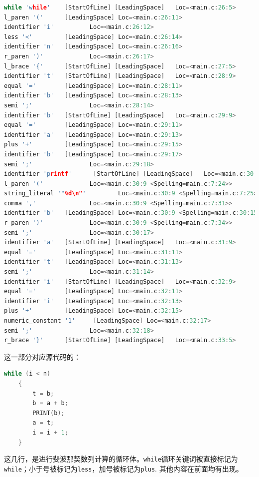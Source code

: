 \documentclass[UTF8,a4paper,10pt]{ctexart}
\begin{document}
\begin{lstlisting}[title=词法分析片段 7,frame=trbl,language={C++}]
while 'while'    [StartOfLine] [LeadingSpace]   Loc=<main.c:26:5>
l_paren '('      [LeadingSpace] Loc=<main.c:26:11>
identifier 'i'          Loc=<main.c:26:12>
less '<'         [LeadingSpace] Loc=<main.c:26:14>
identifier 'n'   [LeadingSpace] Loc=<main.c:26:16>
r_paren ')'             Loc=<main.c:26:17>
l_brace '{'      [StartOfLine] [LeadingSpace]   Loc=<main.c:27:5>
identifier 't'   [StartOfLine] [LeadingSpace]   Loc=<main.c:28:9>
equal '='        [LeadingSpace] Loc=<main.c:28:11>
identifier 'b'   [LeadingSpace] Loc=<main.c:28:13>
semi ';'                Loc=<main.c:28:14>
identifier 'b'   [StartOfLine] [LeadingSpace]   Loc=<main.c:29:9>
equal '='        [LeadingSpace] Loc=<main.c:29:11>
identifier 'a'   [LeadingSpace] Loc=<main.c:29:13>
plus '+'         [LeadingSpace] Loc=<main.c:29:15>
identifier 'b'   [LeadingSpace] Loc=<main.c:29:17>
semi ';'                Loc=<main.c:29:18>
identifier 'printf'      [StartOfLine] [LeadingSpace]   Loc=<main.c:30:9 <Spelling=main.c:7:18>>
l_paren '('             Loc=<main.c:30:9 <Spelling=main.c:7:24>>
string_literal '"%d\n"'         Loc=<main.c:30:9 <Spelling=main.c:7:25>>
comma ','               Loc=<main.c:30:9 <Spelling=main.c:7:31>>
identifier 'b'   [LeadingSpace] Loc=<main.c:30:9 <Spelling=main.c:30:15>>
r_paren ')'             Loc=<main.c:30:9 <Spelling=main.c:7:34>>
semi ';'                Loc=<main.c:30:17>
identifier 'a'   [StartOfLine] [LeadingSpace]   Loc=<main.c:31:9>
equal '='        [LeadingSpace] Loc=<main.c:31:11>
identifier 't'   [LeadingSpace] Loc=<main.c:31:13>
semi ';'                Loc=<main.c:31:14>
identifier 'i'   [StartOfLine] [LeadingSpace]   Loc=<main.c:32:9>
equal '='        [LeadingSpace] Loc=<main.c:32:11>
identifier 'i'   [LeadingSpace] Loc=<main.c:32:13>
plus '+'         [LeadingSpace] Loc=<main.c:32:15>
numeric_constant '1'     [LeadingSpace] Loc=<main.c:32:17>
semi ';'                Loc=<main.c:32:18>
r_brace '}'      [StartOfLine] [LeadingSpace]   Loc=<main.c:33:5>
\end{lstlisting}

这一部分对应源代码的：
\begin{lstlisting}[frame=trbl,language={C++}]
    while (i < n)
    {
        t = b;
        b = a + b;
        PRINT(b);
        a = t;
        i = i + 1;
    }
\end{lstlisting}
这几行，是进行斐波那契数列计算的循环体。\texttt{while}循环关键词被直接标记为\texttt{while}；小于号被标记为\texttt{less}，加号被标记为\texttt{plus}. 其他内容在前面均有出现。
\end{document}
